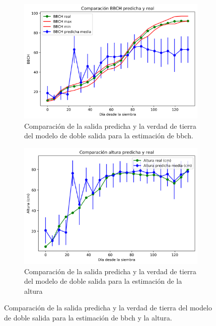 \begin{figure}[H]
\centering
\begin{subfigure}{.85\textwidth}
  \centering
  \includegraphics[width=0.95\linewidth]{archivos/tfg/Pixel/BBCHH_COMPARACION_BIEN_BBCH}
  \caption{Comparación de la salida predicha y la verdad de tierra del modelo de doble salida para la estimación de \gls{bbch}. \label{fig:p_sub_c1}}
\end{subfigure}

\begin{subfigure}{.85\textwidth}
  \centering
  \includegraphics[width=0.95\linewidth]{archivos/tfg/Pixel/BBCHH_COMPARACION_BIEN_H}
  \caption{Comparación de la salida predicha y la verdad de tierra del modelo de doble salida para la estimación de la altura\label{fig:p_sub_c2}}
\end{subfigure}
\caption{Comparación de la salida predicha y la verdad de tierra del modelo de doble salida para la estimación de \gls{bbch} y la altura. \label{fig:p_comp_bh}}
\end{figure}


